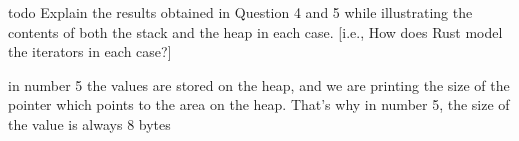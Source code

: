 todo
Explain the results obtained in Question 4 and 5 while illustrating the contents of both the
stack and the heap in each case. [i.e., How does Rust model the iterators in each case?]

in number 5 the values are stored on the heap, and we are printing the size of
the pointer which points to the area on the heap. That's why in number 5, the
size of the value is always 8 bytes
